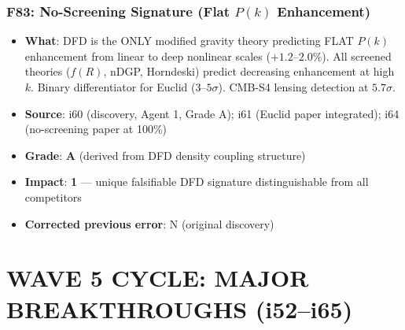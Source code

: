 \documentclass[11pt,a4paper]{article}
\newcommand{\grade}[1]{\textbf{#1}}
\newcommand{\impact}[1]{\textbf{#1}}
\begin{document}
\section{F83: No-Screening Signature (Flat $P(k)$ Enhancement)}
\begin{itemize}[nosep]
\item \textbf{What}: DFD is the ONLY modified gravity theory predicting FLAT $P(k)$ enhancement from linear to deep nonlinear scales ($+1.2$--$2.0\%$). All screened theories ($f(R)$, nDGP, Horndeski) predict decreasing enhancement at high $k$. Binary differentiator for Euclid ($3$--$5\sigma$). CMB-S4 lensing detection at $5.7\sigma$.
\item \textbf{Source}: i60 (discovery, Agent 1, Grade A); i61 (Euclid paper integrated); i64 (no-screening paper at 100\%)
\item \textbf{Grade}: \grade{A} (derived from DFD density coupling structure)
\item \textbf{Impact}: \impact{1} --- unique falsifiable DFD signature distinguishable from all competitors
\item \textbf{Corrected previous error}: N (original discovery)
\end{itemize}


\part{WAVE 5 CYCLE: MAJOR BREAKTHROUGHS (i52--i65)}
\label{part:wave5major}

\end{document}
